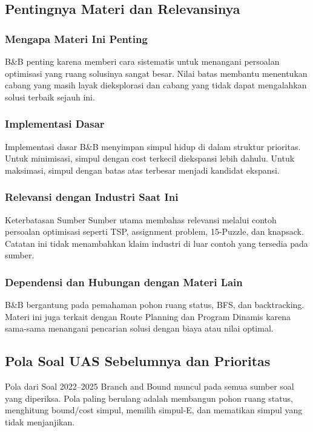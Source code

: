 \subsection{Pentingnya Materi dan Relevansinya}
\subsubsection{Mengapa Materi Ini Penting}
B\&B penting karena memberi cara sistematis untuk menangani persoalan optimisasi yang ruang solusinya sangat besar. Nilai batas membantu menentukan cabang yang masih layak dieksplorasi dan cabang yang tidak dapat mengalahkan solusi terbaik sejauh ini.

\subsubsection{Implementasi Dasar}
Implementasi dasar B\&B menyimpan simpul hidup di dalam struktur prioritas. Untuk minimisasi, simpul dengan cost terkecil diekspansi lebih dahulu. Untuk maksimasi, simpul dengan batas atas terbesar menjadi kandidat ekspansi.

\subsubsection{Relevansi dengan Industri Saat Ini}
\begin{cmt}{Keterbatasan Sumber}{}
Sumber utama membahas relevansi melalui contoh persoalan optimisasi seperti TSP, assignment problem, 15-Puzzle, dan knapsack. Catatan ini tidak menambahkan klaim industri di luar contoh yang tersedia pada sumber.
\end{cmt}

\subsubsection{Dependensi dan Hubungan dengan Materi Lain}
B\&B bergantung pada pemahaman pohon ruang status, BFS, dan backtracking. Materi ini juga terkait dengan Route Planning dan Program Dinamis karena sama-sama menangani pencarian solusi dengan biaya atau nilai optimal.

\subsection{Pola Soal UAS Sebelumnya dan Prioritas}

\begin{cmt}{Pola dari Soal 2022--2025}{}
Branch and Bound muncul pada semua sumber soal yang diperiksa. Pola paling berulang adalah membangun pohon ruang status, menghitung bound/cost simpul, memilih simpul-E, dan mematikan simpul yang tidak menjanjikan.
\end{cmt}

